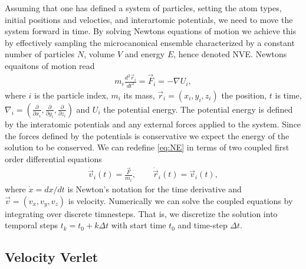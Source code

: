 Assuming that one has defined a system of particles, setting the atom types, initial positions and velocties, and interartomic potentials, we need
to move the system forward in time. By solving Newtons equations of motion we achieve this by effectively sampling the microcanonical ensemble characterized by a constant
number of particles $N$, volume $V$ and energy $E$, hence denoted NVE. Newtons
equaitons of motion read
\begin{align}
  m_i \frac{d^2 \vec{r}_i}{dt^2} = \vec{F}_i = -\nabla U_i,
  \label{eq:NE}
\end{align}
where $i$ is the particle index, $m_i$ its mass, $\vec{r}_i = (x_i, y_i,
z_i)$ the position, $t$ is time,  $\nabla_i = (\frac{\partial}{\partial x_i},
\frac{\partial}{\partial y_i}, \frac{\partial}{\partial z_i})$ and $U_i$ the
potential energy. The potential energy is defined by the interatomic potentials and any external forces applied to the system. Since the forces defined by the potentials is conservative we expect the energy of the solution
to be conserved. We can redefine \cref{eq:NE} in terms of two coupled first
order differential equations 
\begin{align}
  \dot{\vec{v}}_i(t) = \frac{\vec{F}}{m_i}, \qquad \dot{\vec{r}}_i(t) = \vec{v}_i(t),
  \label{eq:NE_2}
\end{align}
where $\dot{x} = dx/dt$ is Newton's notation for the time derivative and $\vec{v} = (v_x, v_y, v_z)$ is velocity. Numerically we can solve the coupled equations by integrating over
discrete timnesteps. That is, we discretize the solution into temporal steps
$t_k = t_0 + k\Delta t$ with start time $t_0$ and time-step $\Delta t$. 



\subsection{Velocity Verlet}

